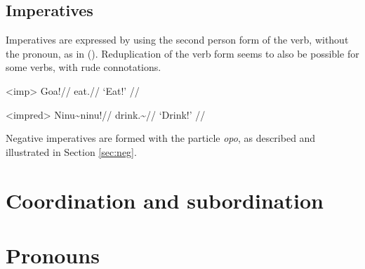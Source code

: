 \documentclass[12pt]{article}
\begin{document}
\subsection{Imperatives}

Imperatives are expressed by using the second person form of the verb, without the pronoun, as in (). Reduplication of the verb form seems to also be possible for some verbs, with rude connotations.

\ex<imp>
\begingl %
\gla Goa!//
\glb eat.\Second{}\Sg{}//
\glft `Eat!' //
\endgl
\xe

\ex<impred>
\begingl %
\gla Ninu\textasciitilde ninu!//
\glb drink.\Second{}\Sg{}\textasciitilde \Rdp{}//
\glft `Drink!' // 
\endgl
\xe

Negative imperatives are formed with the particle \textit{opo}, as described and illustrated in Section \ref{sec:neg}.

\section{Coordination and subordination}

\section{Pronouns}
\end{document}
